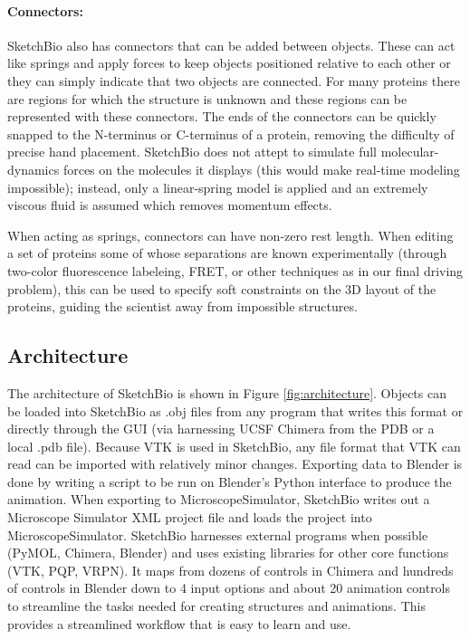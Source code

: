 \documentclass[twocolumn]{bmcart}%
\begin{document}

\paragraph*{Connectors:}
SketchBio also has connectors that can be added between objects.
These can act like springs and apply forces to keep objects positioned relative to each other or they can simply indicate that two objects are connected.
For many proteins there are regions for which the structure is unknown and these regions can be represented with these connectors.
The ends of the connectors can be quickly snapped to the N-terminus or C-terminus of a protein, removing the difficulty of precise hand placement.
SketchBio does not attept to simulate full molecular-dynamics forces on the molecules it displays (this would make real-time modeling impossible); instead, only a linear-spring model is applied and an extremely viscous fluid is assumed which removes momentum effects.

When acting as springs, connectors can have non-zero rest length.
When editing a set of proteins some of whose separations are known experimentally (through two-color fluorescence labeleing, FRET, or other techniques as in our final driving problem), this can be used to specify soft constraints on the 3D layout of the proteins, guiding the scientist away from impossible structures.

\subsection*{Architecture}

The architecture of SketchBio is shown in Figure \ref{fig:architecture}.
Objects can be loaded into SketchBio as .obj files from any program that writes this format or directly through the GUI (via harnessing UCSF Chimera from the PDB or a local .pdb file).
Because VTK is used in SketchBio, any file format that VTK can read can be imported with relatively minor changes.
Exporting data to Blender is done by writing a script to be run on Blender's Python interface to produce the animation.
When exporting to MicroscopeSimulator, SketchBio writes out a Microscope Simulator XML project file and loads the project into MicroscopeSimulator.
SketchBio harnesses external programs when possible (PyMOL, Chimera, Blender) and uses existing libraries for other core functions (VTK, PQP, VRPN).
It maps from dozens of controls in Chimera and hundreds of controls in Blender down to 4 input options and about 20 animation controls to streamline the tasks needed for creating structures and animations.
This provides a streamlined workflow that is easy to learn and use.
\end{document}
